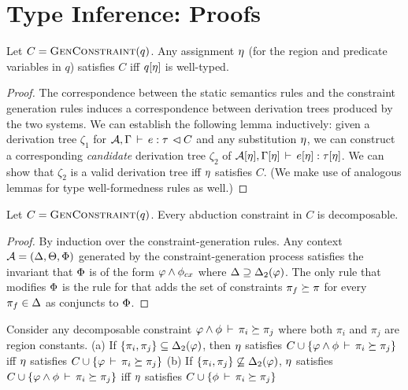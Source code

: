 \section{Type Inference: Proofs}

\begin{theorem}
\label{thm:constraint-generation-sc}
Let $C = \textsc{GenConstraint}(q)$.
Any assignment $\eta$ (for the region and predicate variables in $q$)
satisfies $C$ iff $q[\eta]$ is well-typed.
\end{theorem}
\begin{proof}
The correspondence between the static semantics rules and the constraint generation
rules induces a correspondence between derivation trees produced by the
two systems.
We can establish the following lemma inductively:
given a derivation tree $\zeta_1$ for
${{\mathcal{A}},\Gamma} \, \vdash \, {e} : {\tau} \, \lhd {C}$
and any substitution $\eta$,
we can construct a corresponding \emph{candidate} derivation
tree $\zeta_2$ of ${\mathcal{A}}[\eta],\Gamma[\eta]\,\vdash\,e[\eta]:\tau[\eta]$.
We can show that $\zeta_2$ is a valid derivation tree iff $\eta$ satisfies $C$.
(We make use of analogous lemmas for type well-formedness rules as well.)
\end{proof}

\begin{lemma}
  \label{lemma:gc-is-decomposable}
  Let $C = \textsc{GenConstraint}(q)$. Every abduction constraint in $C$ is decomposable.
\end{lemma}

\begin{proof}
  By induction over the constraint-generation rules.
  Any context ${\mathcal{A}} = (\Delta,\Theta,\Phi)$ generated by the constraint-generation
  process satisfies the invariant that $\Phi$ is of the form $\varphi \wedge \phi_{cx}$
  where $\Delta \supseteq {\Delta_2}(\varphi)$.
  The only rule that modifies $\Phi$ is the rule for 
  that adds the set of constraints $\pi_f \succeq \pi$ for every $\pi_f \in \Delta$
  as conjuncts to $\Phi$.
\end{proof}

\begin{lemma}
  \label{lemma:decomposition}
  Consider any decomposable constraint  $\varphi \wedge \phi\,\vdash\,\pi_i \succeq \pi_j$
where both $\pi_i$ and $\pi_j$ are region constants.
(a) If $\{ \pi_i, \pi_j \} \subseteq {\Delta_2}(\varphi)$,
then $\eta$ satisfies $C \cup \{ \varphi \wedge \phi\,\vdash\,\pi_i \succeq \pi_j \}$
iff
$\eta$ satisfies $C \cup \{ \varphi\,\vdash\,\pi_i \succeq \pi_j \}$
  (b) If $\{ \pi_i, \pi_j \} \not \subseteq {\Delta_2}(\varphi)$,
$\eta$ satisfies $C \cup \{ \varphi \wedge \phi\,\vdash\,\pi_i \succeq \pi_j \}$
iff
$\eta$ satisfies $C \cup \{ \phi\,\vdash\,\pi_i \succeq \pi_j \}$
\end{lemma}

